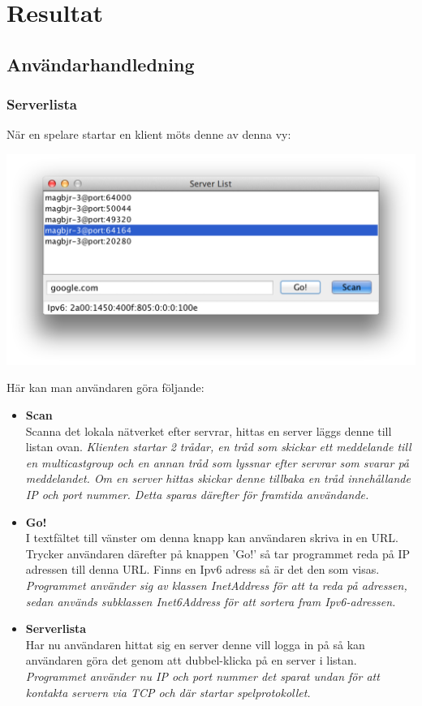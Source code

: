 \documentclass[10pt, titlepage, oneside, a4paper]{article}
\begin{document}
	\section{Resultat}
		\subsection{Användarhandledning}
			\subsubsection{Serverlista}
			När en spelare startar en klient möts denne av denna vy:
				\begin{center}
					\includegraphics[scale=.5]{./documentation/images/scr2.png}
				\end{center}
				Här kan man användaren göra följande:
				\begin{itemize}
					\item \textbf{Scan}\\Scanna det lokala nätverket efter servrar, hittas en server läggs denne till listan ovan. \textit{Klienten startar 2 trådar, en tråd som skickar ett meddelande till en multicastgroup och en annan tråd som lyssnar efter servrar som svarar på meddelandet. Om en server hittas skickar denne tillbaka en tråd innehållande IP och port nummer. Detta sparas därefter för framtida användande.}
					\item \textbf{Go!}\\I textfältet till vänster om denna knapp kan användaren skriva in en URL. Trycker användaren därefter på knappen 'Go!' så tar programmet reda på IP adressen till denna URL. Finns en Ipv6 adress så är det den som visas. \textit{Programmet använder sig av klassen InetAddress för att ta reda på adressen, sedan används subklassen Inet6Address för att sortera fram Ipv6-adressen.}
					\item \textbf{Serverlista}\\ Har nu användaren hittat sig en server denne vill logga in på så kan användaren göra det genom att dubbel-klicka på en server i listan. \textit{Programmet använder nu IP och port nummer det sparat undan för att kontakta servern via TCP och där startar spelprotokollet.}
				\end{itemize}
\end{document}
